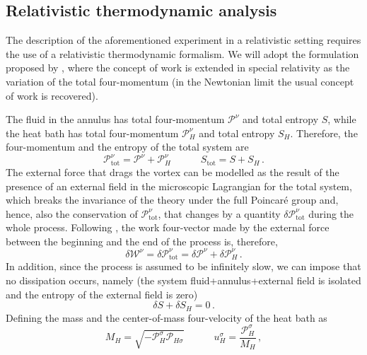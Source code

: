 \documentclass[preprints,article,accept,moreauthors,pdftex]{mdpi}
\newcommand{\spc}{\quad \quad \quad}
\begin{document}
\subsection{Relativistic thermodynamic analysis}

The description of the aforementioned experiment in a relativistic setting requires the use of a relativistic thermodynamic formalism. We will adopt the formulation proposed by \citet{GavassinoTermometri}, where the concept of work is extended in special relativity as  
the  variation of the total four-momentum (in the Newtonian limit the usual concept of work is recovered).

The fluid in the annulus has total four-momentum $\mathcal{P}^\nu$ and total entropy $S$, while the 
heat bath has total four-momentum $\mathcal{P}_H^\nu$ and total entropy $S_H$. 
Therefore, the  four-momentum and the entropy of the total system are 
\begin{equation}
\mathcal{P}_{\text{tot}}^\nu = \mathcal{P}^\nu+ \mathcal{P}^\nu_H  \spc 
S_{\text{tot}} = S+S_H \, . 
\end{equation}
The external force that drags the vortex can be modelled as the result of the presence of an external field in the microscopic Lagrangian for the total system, which breaks the invariance of the theory under the full Poincar\'{e} group and, hence, also the conservation of $\mathcal{P}_{\text{tot}}^\nu $, that changes by a quantity $\delta \mathcal{P}_{\text{tot}}^\nu $ during the whole process. 
Following \cite{GavassinoTermometri}, the work four-vector  made by the external force between the beginning and the end of the process is, therefore,
\begin{equation}\label{worKKK}
\delta \mathcal{W}^\nu = \delta \mathcal{P}_{\text{tot}}^\nu  
= \delta \mathcal{P}^\nu+ \delta \mathcal{P}^\nu_H \, .
\end{equation}
In addition, since the process is assumed to be infinitely slow, we can impose that no dissipation occurs, namely (the system fluid+annulus+external field is isolated and the entropy of the external field is zero)
\begin{equation}\label{nondiss}
\delta S+ \delta S_H =0 \, .
\end{equation}
Defining the mass and the center-of-mass four-velocity of the heat bath as  
\begin{equation}
M_H = \sqrt{-\mathcal{P}_H^\sigma \mathcal{P}_{H\sigma}}  \spc
u_H^\sigma = \dfrac{\mathcal{P}_H^\sigma}{M_H} \, ,
\end{equation}
\end{document}
